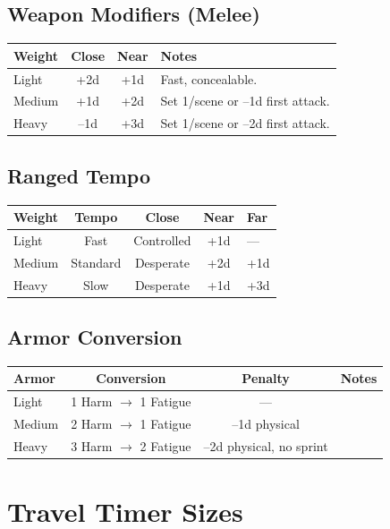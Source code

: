 \subsection*{Weapon Modifiers (Melee)}
\feTableStart
\begin{tabularx}{\linewidth}{@{}l c c l@{}}
\toprule
\textbf{Weight} & \textbf{Close} & \textbf{Near} & \textbf{Notes} \\
\midrule
Light  & +2d & +1d & Fast, concealable. \\
Medium & +1d & +2d & Set 1/scene or --1d first attack. \\
Heavy  & --1d & +3d & Set 1/scene or --2d first attack. \\
\bottomrule
\end{tabularx}
\feTableEnd

\subsection*{Ranged Tempo}
\feTableStart
\begin{tabularx}{\linewidth}{@{}l c c c l@{}}
\toprule
\textbf{Weight} & \textbf{Tempo} & \textbf{Close} & \textbf{Near} & \textbf{Far} \\
\midrule
Light  & Fast      & Controlled & +1d & --- \\
Medium & Standard  & Desperate  & +2d & +1d \\
Heavy  & Slow      & Desperate  & +1d & +3d \\
\bottomrule
\end{tabularx}
\meTableEnd

\subsection*{Armor Conversion}
\feTableStart
\begin{tabularx}{\linewidth}{@{}l c c l@{}}
\toprule
\textbf{Armor} & \textbf{Conversion} & \textbf{Penalty} & \textbf{Notes} \\
\midrule
Light  & 1 Harm $\rightarrow$ 1 Fatigue & --- & \\
Medium & 2 Harm $\rightarrow$ 1 Fatigue & --1d physical & \\
Heavy  & 3 Harm $\rightarrow$ 2 Fatigue & --2d physical, no sprint & \\
\bottomrule
\end{tabularx}
\feTableEnd

\section*{Travel Timer Sizes}\label{sec:travel_timers}

